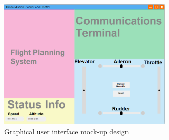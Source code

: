 \documentclass[12pt,a4paper]{article}
\begin{document}
	\begin{figure}[h!]

  		\centering
    	\includegraphics[width=0.75\textwidth]{guiMockup.png}
   		\caption{Graphical user interface mock-up design}
	\end{figure}
\end{document}

